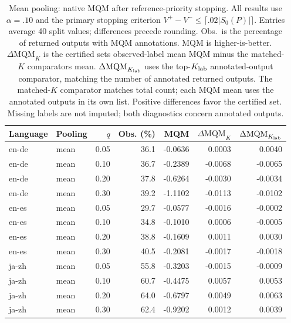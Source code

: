 \begin{table}[t]
\centering\small
\begin{tabular}{llrrrrr}
\toprule
Language & Pooling & $q$ & Obs. (\%) & MQM & $\Delta\mathrm{MQM}_K$ & $\Delta\mathrm{MQM}_{K_{\rm lab}}$ \\
\midrule
en-de & mean & 0.05 & 36.1 & -0.0636 & 0.0003 & 0.0040 \\
en-de & mean & 0.10 & 36.7 & -0.2389 & -0.0068 & -0.0065 \\
en-de & mean & 0.20 & 37.8 & -0.6264 & -0.0030 & -0.0034 \\
en-de & mean & 0.30 & 39.2 & -1.1102 & -0.0113 & -0.0102 \\
en-es & mean & 0.05 & 29.7 & -0.0577 & -0.0016 & -0.0002 \\
en-es & mean & 0.10 & 34.8 & -0.1010 & 0.0006 & -0.0005 \\
en-es & mean & 0.20 & 38.8 & -0.1609 & 0.0011 & 0.0030 \\
en-es & mean & 0.30 & 40.5 & -0.2081 & -0.0017 & -0.0018 \\
ja-zh & mean & 0.05 & 55.8 & -0.3203 & -0.0015 & -0.0009 \\
ja-zh & mean & 0.10 & 60.7 & -0.4475 & 0.0057 & 0.0053 \\
ja-zh & mean & 0.20 & 64.0 & -0.6797 & 0.0049 & 0.0063 \\
ja-zh & mean & 0.30 & 62.4 & -0.9202 & 0.0012 & 0.0039 \\
\bottomrule
\end{tabular}
\caption{Mean pooling: native MQM after reference-priority stopping. All results use $\alpha=.10$ and the primary stopping criterion $V^+-V^-\le\lceil.02|S_0(P)|\rceil$. Entries average 40 split values; differences precede rounding. Obs.\ is the percentage of returned outputs with MQM annotations. MQM is higher-is-better. $\Delta\mathrm{MQM}_K$ is the certified set\textquotesingle s observed-label mean MQM minus the matched-$K$ comparator\textquotesingle s mean. $\Delta\mathrm{MQM}_{K_{\rm lab}}$ uses the top-$K_{\rm lab}$ annotated-output comparator, matching the number of annotated returned outputs. The matched-$K$ comparator matches total count; each MQM mean uses the annotated outputs in its own list. Positive differences favor the certified set. Missing labels are not imputed; both diagnostics concern annotated outputs.}
\label{tab:review-mqm-mean}
\end{table}

